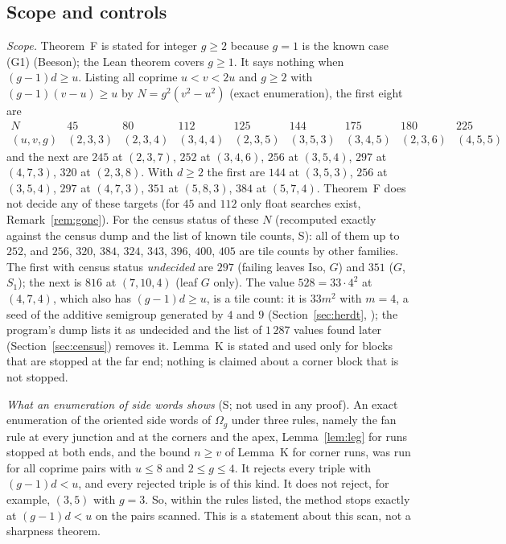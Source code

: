 \documentclass[11pt,reqno]{amsart}
\theoremstyle{plain}
\theoremstyle{definition}
\newcommand{\sS}{\textup{\textsf{S}}}
\begin{document}
\subsection{Scope and controls}\label{sub:scope}
\emph{Scope.} Theorem~F is stated for integer $g\ge2$ because $g=1$ is the known case (G1) (Beeson); the Lean theorem covers $g\ge1$. It says nothing when $(g-1)d\ge u$. Listing all coprime $u<v<2u$ and $g\ge2$ with $(g-1)(v-u)\ge u$ by $N=g^2(v^2-u^2)$ (exact enumeration), the first eight are
\[
\begin{array}{c|cccccccc}
N & 45 & 80 & 112 & 125 & 144 & 175 & 180 & 225\\
(u,v,g) & (2,3,3) & (2,3,4) & (3,4,4) & (2,3,5) & (3,5,3) & (3,4,5) & (2,3,6) & (4,5,5)
\end{array}
\]
and the next are $245$ at $(2,3,7)$, $252$ at $(3,4,6)$, $256$ at $(3,5,4)$, $297$ at $(4,7,3)$, $320$ at $(2,3,8)$. With $d\ge2$ the first are $144$ at $(3,5,3)$, $256$ at $(3,5,4)$, $297$ at $(4,7,3)$, $351$ at $(5,8,3)$, $384$ at $(5,7,4)$.
Theorem~F does not decide any of these targets (for $45$ and $112$ only float searches exist, Remark~\ref{rem:gone}). For the census status of these $N$ (recomputed exactly against the census dump and the list of known tile counts, \sS): all of them up to $252$, and $256$, $320$, $384$, $324$, $343$, $396$, $400$, $405$ are tile counts by other families. The first with census status \emph{undecided} are $297$ (failing leaves $\mathrm{Iso}$, $G$) and $351$ ($G$, $S_1$); the next is $816$ at $(7,10,4)$ (leaf $G$ only). The value $528=33\cdot4^2$ at $(4,7,4)$, which also has $(g-1)d\ge u$, is a tile count: it is $33m^2$ with $m=4$, a seed of the additive semigroup generated by $4$ and $9$ (Section~\ref{sec:herdt}, ); the program's dump lists it as undecided and the list of $1\,287$ values found later (Section~\ref{sec:census}) removes it.
Lemma~K is stated and used only for blocks that are stopped at the far end; nothing is claimed about a corner block that is not stopped.

\emph{What an enumeration of side words shows} (\sS; not used in any proof). An exact enumeration of the oriented side words of $\Omega_{g}$ under three rules, namely the fan rule at every junction and at the corners and the apex, Lemma~\ref{lem:leg} for runs stopped at both ends, and the bound $n\ge v$ of Lemma~K for corner runs, was run for all coprime pairs with $u\le8$ and $2\le g\le4$. It rejects every triple with $(g-1)d<u$, and every rejected triple is of this kind. It does not reject, for example, $(3,5)$ with $g=3$. So, within the rules listed, the method stops exactly at $(g-1)d<u$ on the pairs scanned. This is a statement about this scan, not a sharpness theorem.
\end{document}
